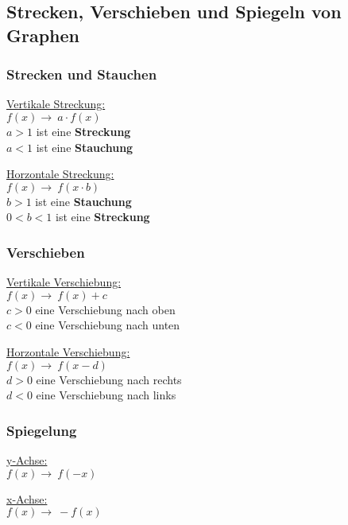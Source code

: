 \subsection{Strecken, Verschieben und Spiegeln von Graphen}

\subsubsection{Strecken und Stauchen}

\underline{Vertikale Streckung:} \\
$f(x) \rightarrow\ a\cdot f(x)$ \\
$a > 1$ ist eine \textbf{Streckung} \\
$a < 1$ ist eine \textbf{Stauchung} 

\underline{Horzontale Streckung:} \\
$f(x) \rightarrow\ f(x \cdot b)$ \\
$b > 1$ ist eine \textbf{Stauchung} \\
$0 < b < 1$ ist eine \textbf{Streckung} 

\subsubsection{Verschieben}
\underline{Vertikale Verschiebung:} \\
$f(x) \rightarrow\ f(x) + c$ \\
$c > 0$ eine Verschiebung nach oben \\
$c < 0$ eine Verschiebung nach unten

\underline{Horzontale Verschiebung:} \\
$f(x) \rightarrow\ f(x - d)$ \\
$d > 0$ eine Verschiebung nach rechts \\
$d < 0$ eine Verschiebung nach links

\subsubsection{Spiegelung}
\underline{y-Achse:} \\
$f(x) \rightarrow\ f(-x)$

\underline{x-Achse:} \\
$f(x) \rightarrow\ -f(x)$
